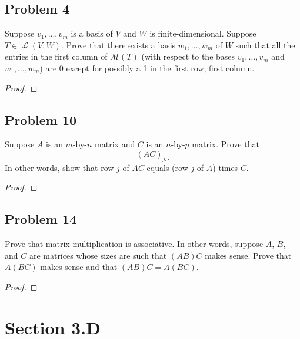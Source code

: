 \documentclass[letterpaper, 12pt]{amsart}
\DeclareMathOperator{\Ell}{\mathscr{L}}
\theoremstyle{definition}  %
\begin{document}
		\subsection*{Problem 4}
		Suppose $v_{1}, \dots, v_{m}$ is a basis of $V$ and $W$ is finite-dimensional. 
		Suppose $T \in \Ell(V,W)$. 
		Prove that there exists a basis $w_{1}, \dots, w_{m}$ of $W$ such that all the entries in the first column of $\mathcal{M}(T)$ (with respect to the bases $v_{1}, \dots, v_{m}$ and $w_{1}, \dots, w_{m}$) are 0 except for possibly a 1 in the first row, first column.

		\begin{proof}
		\end{proof}

		\subsection*{Problem 10}
		Suppose $A$ is an $m$-by-$n$ matrix and $C$ is an $n$-by-$p$ matrix. 
		Prove that $$(AC)_{j,\cdot}$$
		In other words, show that row $j$ of $AC$ equals (row $j$ of $A$) times $C$.

		\begin{proof}
		\end{proof}

		\subsection*{Problem 14}
		Prove that matrix multiplication is associative. 
		In other words, suppose $A$, $B$, and $C$ are matrices whose sizes are such that $(AB)C$ makes sense. Prove that $A(BC)$ makes sense and that $(AB)C = A(BC)$.

		\begin{proof}
		\end{proof}

	\section*{Section 3.D}
\end{document}
